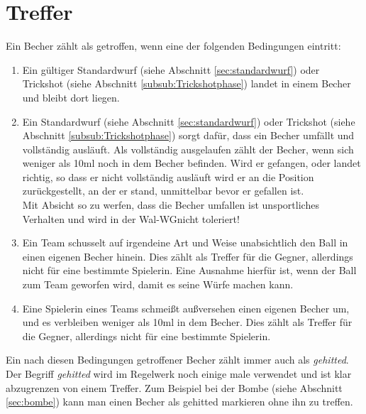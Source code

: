 \documentclass[a5paper, 12pt]{book}
\begin{document}
\section{Treffer}\label{sec:treffer}
Ein Becher zählt als getroffen, wenn eine der folgenden Bedingungen eintritt:
\begin{enumerate} [(1)]
    \item Ein gültiger Standardwurf (siehe Abschnitt \ref{sec:standardwurf}) oder Trickshot (siehe Abschnitt \ref{subsub:Trickshotphase}) landet in einem Becher und bleibt dort liegen.\\
    \item Ein Standardwurf (siehe Abschnitt \ref{sec:standardwurf}) oder Trickshot (siehe Abschnitt \ref{subsub:Trickshotphase}) sorgt dafür, dass ein Becher umfällt und vollständig ausläuft. Als vollständig ausgelaufen zählt der Becher, wenn sich weniger als 10ml noch in dem Becher befinden. Wird er gefangen, oder landet richtig, so dass er nicht vollständig ausläuft wird er an die Position zurückgestellt, an der er stand, unmittelbar bevor er gefallen ist. \\
Mit Absicht so zu werfen, dass die Becher umfallen ist unsportliches Verhalten und wird in der Wal-WG\texttrademark nicht toleriert!
\item Ein Team schusselt auf irgendeine Art und Weise unabsichtlich den Ball in einen eigenen Becher hinein. Dies zählt als Treffer für die Gegner, allerdings nicht für eine bestimmte Spielerin. Eine Ausnahme hierfür ist, wenn der Ball zum Team geworfen wird, damit es seine Würfe machen kann. 

\item  Eine Spielerin eines Teams schmeißt außversehen einen eigenen Becher um, und es verbleiben weniger als 10ml in dem Becher. Dies zählt als Treffer für die Gegner, allerdings nicht für eine bestimmte Spielerin. 
\end{enumerate}
Ein nach diesen Bedingungen getroffener Becher zählt immer auch als \textit{gehitted}. Der Begriff \textit{gehitted} wird im Regelwerk noch einige male verwendet und ist klar abzugrenzen von einem Treffer. Zum Beispiel bei der Bombe (siehe Abschnitt \ref{sec:bombe}) kann man einen Becher als gehitted markieren ohne ihn zu treffen. 
\end{document}
